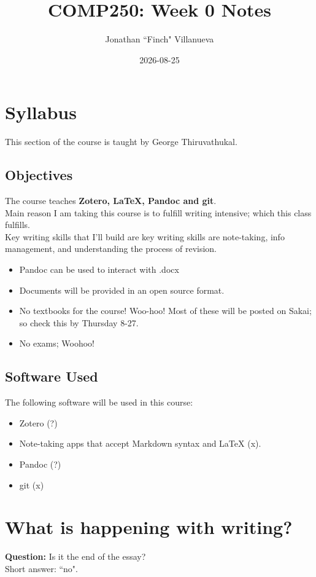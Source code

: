 \documentclass{article}
\title{COMP250: Week 0 Notes}
\author{Jonathan ``Finch" Villanueva}
\date{2026-08-25}
\begin{document}
\maketitle
\noindent
\section{Syllabus}
This section of the course is taught by George Thiruvathukal.

\raggedright
\subsection{Objectives}
The course teaches \textbf{Zotero, LaTeX, Pandoc and git}.
\\
Main reason I am taking this course is to fulfill writing
intensive; which this class fulfills. \\
Key writing skills that I'll build are key writing skills are 
note-taking, info management, and understanding the process of revision.

\begin{itemize}
  \item Pandoc can be used to interact with .docx
  \item Documents will be provided in an open source format.
  \item No textbooks for the course! Woo-hoo! Most of these will be
    posted on Sakai; so check this by Thursday 8-27.
  \item No exams; Woohoo!
\end{itemize}
\subsection{Software Used}
The following software will be used in this course:
\begin{itemize}
  \item Zotero (?)
  \item Note-taking apps that accept Markdown syntax and LaTeX (x).
  \item Pandoc (?)
  \item git (x)
\end{itemize}
\section{What is happening with writing?}
\textbf{Question:} Is it the end of the essay?
\\
Short answer: ``no".
\end{document}
